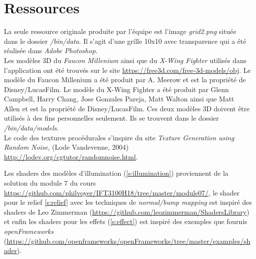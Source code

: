 \section{Ressources}
\label{s:ressources}

La seule ressource originale produite par l'équipe est l'image \textit{grid2.png} située dans le dossier \textit{/bin/data}.
Il s'agit d'une grille 10x10 avec transparence qui a été réalisée dans \textit{Adobe Photoshop}.\\

Les modèles 3D du \textit{Faucon Millenium} ainsi que du \textit{X-Wing Fighter} utilisés dans l'application ont été trouvés sur le site \url{https://free3d.com/free-3d-models/obj}.
Le modèle du Faucon Millenium a été produit par A. Meerow et est la propriété de Disney/LucasFilm.
Le modèle du X-Wing Fighter a été produit par Glenn Campbell, Harry Chang, Jose Gonzales Pareja, Matt Walton ainsi que Matt Allen et est la propriété de Disney/LucasFilm.
Ces deux modèles 3D doivent être utilisés à des fins personnelles seulement.
Ils se trouvent dans le dossier \textit{/bin/data/models}.\\ 

Le code des textures procédurales s'inspire du site \textit{Texture Generation using Random Noise}, (Lode Vandevenne, 2004) \url{http://lodev.org/cgtutor/randomnoise.html}.
\label{src-procedural-texture}

Les shaders des modèles d'illumination (\ref{s:illumination}) proviennent de la solution du module 7 du cours \url{https://github.com/philvoyer/IFT3100H18/tree/master/module07/}, le shader pour le relief 
\ref{s:relief} avec les techniques de \textit{normal/bump mapping} est inspiré des shaders de Leo Zimmerman (\url{https://github.com/leozimmerman/ShadersLibrary}) et enfin les shaders pour les effets (\ref{s:effect}) est inspiré des exemples que fournis \textit{openFrameworks} (\url{https://github.com/openframeworks/openFrameworks/tree/master/examples/shader}).